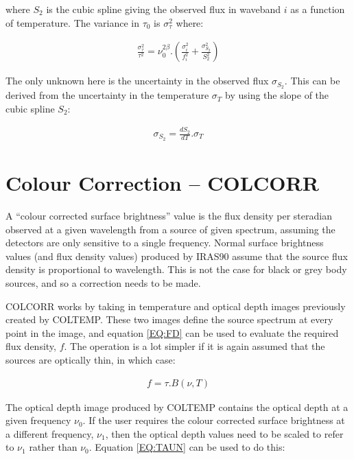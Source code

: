 where $S_{2}$ is the cubic spline giving the observed flux in waveband $i$ as a
function of temperature. The variance in $\tau_{0}$ is $\sigma^{2}_{\tau}$
where:

\begin{eqnarray*}
\frac{\sigma^{2}_{\tau}}{\tau^{2}} = \nu_{0}^{2\beta} .\left(
\frac{\sigma^{2}_{i}}{f_{i}^{2}}  + \frac{\sigma^{2}_{S_{2}}}{S_{2}^{2}}
\right)
\end{eqnarray*}

The only unknown here is the uncertainty in the observed flux $\sigma_{S_{2}}$.
This can be derived from the uncertainty in the temperature $\sigma_{T}$ by
using the slope of the cubic spline $S_{2}$:

\begin{eqnarray*}
\sigma_{S_{2}} = \frac{dS_{2}}{dT}.\sigma_{T}
\end{eqnarray*}

\section{ Colour Correction -- COLCORR}
A ``colour corrected surface brightness'' value is the flux density per
steradian observed at a given wavelength from a source of given spectrum,
assuming the detectors are only sensitive to a single frequency. Normal surface
brightness values (and flux density values) produced by {\small IRAS90} assume
that the source flux density is proportional to wavelength. This is not the case
for black or grey body sources, and so a correction needs to be made.

{\small COLCORR} works by taking in temperature and optical depth images
previously created by {\small COLTEMP}. These two images define the source
spectrum at every point in the image, and equation \ref{EQ:FD} can be used to
evaluate the required flux density, $f$. The operation is a lot simpler if it
is again assumed that the sources are optically thin, in which case:

\begin{eqnarray*}
f = \tau.B( \nu, T )
\end{eqnarray*}

The optical depth image produced by {\small COLTEMP} contains the optical depth
at a given frequency $\nu_{0}$. If the user requires the colour corrected
surface brightness at a different frequency, $\nu_{1}$, then the optical depth
values need to be scaled to refer to $\nu_{1}$ rather than $\nu_{0}$. Equation
\ref{EQ:TAUN} can be used to do this:

